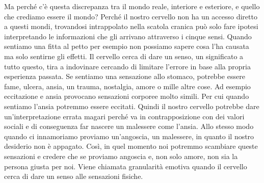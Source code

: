 \documentclass[12pt]{book} %
\begin{document}
Ma perché c'è questa discrepanza tra il mondo reale, interiore e esteriore, e quello che crediamo
essere il mondo? Perché il nostro cervello non ha un accesso diretto a questi mondi, trovandosi intrappolato nella
scatola cranica può solo fare ipotesi interpretando le informazioni che gli arrivano attraverso i cinque sensi. Quando
sentiamo una fitta al petto per esempio non possiamo sapere cosa l'ha causata ma solo sentirne gli effetti. Il cervello
cerca di dare un senso, un significato a tutto questo, tira a indovinare cercando di limitare
l'errore in base alla propria esperienza passata. Se sentiamo una sensazione allo stomaco,
potrebbe essere fame, ulcera, ansia, un trauma, nostalgia, amore o mille altre cose. Ad esempio eccitazione e ansia
provocano sensazioni corporee molto simili. Per cui quando sentiamo l'ansia potremmo essere
eccitati. Quindi il nostro cervello potrebbe dare un'interpretazione errata magari perché va in contrapposizione con
dei valori sociali e di conseguenza far nascere un malessere come l'ansia. Allo stesso modo quando ci innamoriamo
proviamo un'angoscia, un malessere, in quanto il nostro desiderio non è appagato. Così, in quel momento noi potremmo
scambiare queste sensazioni e credere che se proviamo angoscia e, non solo amore, non sia la persona giusta per noi.
Viene chiamata granularità emotiva quando il cervello cerca di dare un senso alle sensazioni
fisiche. 
\end{document}
